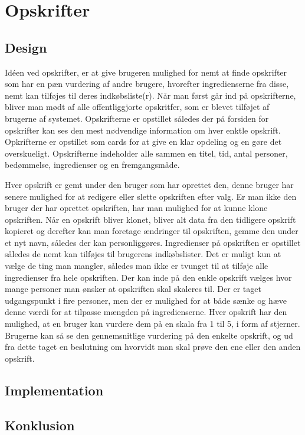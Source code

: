 \section{Opskrifter}

\subsection{Design}
Idéen ved opskrifter, er at give brugeren mulighed for nemt at finde opskrifter som har en pæn vurdering af andre brugere, hvorefter ingredienserne fra disse, nemt kan tilføjes til deres indkøbsliste(r).
Når man først går ind på opskrifterne, bliver man mødt af alle offentliggjorte opskritfer, som er blevet tilføjet af brugerne af systemet. 
Opskrifterne er opstillet således der på forsiden for opskrifter kan ses den mest nødvendige information om hver enktle opskrift.
Opkrifterne er opstillet som cards for at give en klar opdeling og en gøre det overskueligt. 
Opskrifterne indeholder alle sammen en titel, tid, antal personer, bedømmelse, ingredienser og en fremgangsmåde.


Hver opskrift er gemt under den bruger som har oprettet den, denne bruger har senere mulighed for at redigere eller slette opskriften efter valg.
Er man ikke den bruger der har oprettet opskriften, har man mulighed for at kunne klone opskriften.
Når en opskrift bliver klonet, bliver alt data fra den tidligere opskrift kopieret og derefter kan man foretage ændringer til opskriften, gemme den under et nyt navn, således der kan personliggøres.
Ingredienser på opskriften er opstillet således de nemt kan tilføjes til brugerens indkøbslister.
Det er muligt kun at vælge de ting man mangler, således man ikke er tvunget til at tilføje alle ingredienser fra hele opskriften.
Der kan inde på den enkle opskrift vælges hvor mange personer man ønsker at opskriften skal skaleres til.
Der er taget udgangspunkt i fire personer, men der er mulighed for at både sænke og hæve denne værdi for at tilpasse mængden på ingredienserne.
Hver opskrift har den mulighed, at en bruger kan vurdere dem på en skala fra 1 til 5, i form af stjerner. Brugerne kan så se den gennemsnitlige vurdering på den enkelte opskrift, og ud fra dette taget en beslutning om hvorvidt man skal prøve den ene eller den anden opskrift.
\iffalse
Opskrifter der er blevet vurderet højst kommer da til at ligge i toppen af listen af opskrifter, således dårlige eller useriøse opskrifter bliver sorteret til bunden.
\fi

\subsection{Implementation}
\subsection{Konklusion}
